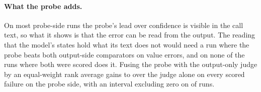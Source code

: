 \paragraph{What the probe adds.}
On most probe-side runs the probe's lead over confidence is visible in the call text, so what it shows is that the error can be read from the output. The reading that the model's states hold what its text does not would need a run where the probe beats both output-side comparators on value errors, and on none of the \nRwRuns{} runs where both were scored does it. Fusing the probe with the output-only judge by an equal-weight rank average gains \fusOutMinInternals{} to \fusOutMaxInternals{} over the judge alone on every scored failure on the probe side, with an interval excluding zero on \nFusOutCiExclInternals{} of \nInternalsRuns{} runs.

\begin{table}[t]
\centering
\footnotesize
\setlength{\tabcolsep}{4pt}
\caption{Wrong argument values against valid calls, per run. Probe minus confidence (point estimate), probe minus the output-only judge, the share of the probe's lead over confidence the judge recovers (n.c.\ where the probe does not lead), probe minus reader and reader minus confidence, with 95\% tool-resampled intervals.}
\label{tab:wavjudges}

\end{table}
